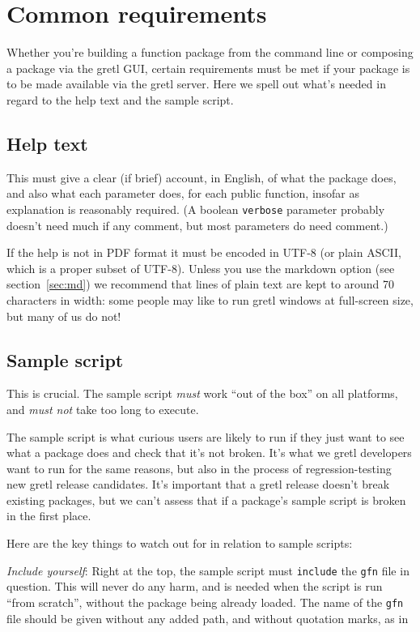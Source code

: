 \documentclass[oneside]{book}
\begin{document}
\section{Common requirements}
\label{sec:common-req}

Whether you're building a function package from the command line or
composing a package via the gretl GUI, certain requirements must be
met if your package is to be made available via the gretl server. Here
we spell out what's needed in regard to the help text and the sample
script.

\subsection{Help text}

This must give a clear (if brief) account, in English, of what the
package does, and also what each parameter does, for each public
function, insofar as explanation is reasonably required. (A boolean
\texttt{verbose} parameter probably doesn't need much if any comment,
but most parameters do need comment.)

If the help is not in PDF format it must be encoded in UTF-8 (or plain
ASCII, which is a proper subset of UTF-8). Unless you use the markdown
option (see section~\ref{sec:md}) we recommend that lines of plain
text are kept to around 70 characters in width: some people may like
to run gretl windows at full-screen size, but many of us do not!

\subsection{Sample script}
\label{sec:common-sample}

This is crucial. The sample script \textit{must} work ``out of the
box'' on all platforms, and \textit{must not} take too long to
execute.

The sample script is what curious users are likely to run if they just
want to see what a package does and check that it's not broken. It's
what we gretl developers want to run for the same reasons, but also in
the process of regression-testing new gretl release candidates. It's
important that a gretl release doesn't break existing packages,
but we can't assess that if a package's sample script is broken in the
first place.

Here are the key things to watch out for in relation to sample
scripts:

\vspace{1ex}
\textit{Include yourself}: Right at the top, the sample script
  must \texttt{include} the \texttt{gfn} file in question. This will
  never do any harm, and is needed when the script is run ``from
  scratch'', without the package being already loaded.  The name of
  the \texttt{gfn} file should be given without any added path, and
  without quotation marks, as in
\end{document}

